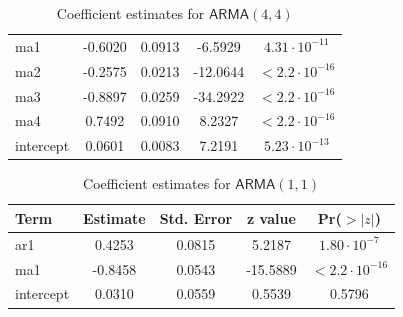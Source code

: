 \documentclass[12pt]{article}
\newcommand{\ARMA}{\textsf{ARMA}}
\begin{document}
\begin{enumerate}
\begin{table}[ht]
\begin{tabular}{l|cccc}
                ma1                            & -0.6020 & 0.0913 & -6.5929  & $4.31 \cdot 10^{-11}$ \\
                ma2                            & -0.2575 & 0.0213 & -12.0644 & $< 2.2 \cdot 10^{-16}$ \\
                ma3                            & -0.8897 & 0.0259 & -34.2922 & $< 2.2 \cdot 10^{-16}$ \\
                ma4                            & 0.7492  & 0.0910 & 8.2327   & $< 2.2 \cdot 10^{-16}$ \\
                intercept                      & 0.0601  & 0.0083 & 7.2191   & $5.23 \cdot 10^{-13}$ \\
            \end{tabular}
            \caption{Coefficient estimates for $\ARMA(4, 4)$}
            \label{tab:arma44_coeffs}
        \end{table}
        \begin{table}[ht]
            \centering
            \begin{tabular}{l|cccc}
                \textbf{Term} & \textbf{Estimate} & \textbf{Std. Error} & \textbf{z value} & \textbf{Pr($>|z|$)} \\
                \hline
                ar1                          & 0.4253  & 0.0815 & 5.2187   & $1.80 \cdot 10^{-7}$ \\
                ma1                          & -0.8458 & 0.0543 & -15.5889 & $< 2.2 \cdot 10^{-16}$ \\
                \rowcolor{red!15} intercept  & 0.0310  & 0.0559 & 0.5539   & 0.5796 \\
            \end{tabular}
            \caption{Coefficient estimates for $\ARMA(1, 1)$}
            \label{tab:arma11_coeffs}
        \end{table}


\end{enumerate}
\end{document}
